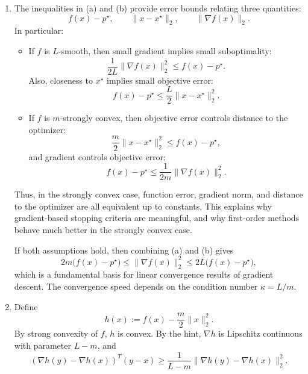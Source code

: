 \documentclass[11pt,letter,notitlepage]{article}
\theoremstyle{definition}
\begin{document}
\begin{solution}
\begin{enumerate}[label=(\alph*)]
    \item The inequalities in (a) and (b) provide error bounds relating three quantities:
    \[
    f(x)-p^\star,\qquad \|x-x^\star\|_2,\qquad \|\nabla f(x)\|_2.
    \]
    In particular:
    \begin{itemize}
        \item If $f$ is $L$-smooth, then small gradient implies small suboptimality:
        \[
        \frac1{2L}\|\nabla f(x)\|_2^2\le f(x)-p^\star.
        \]
        Also, closeness to $x^\star$ implies small objective error:
        \[
        f(x)-p^\star\le \frac{L}{2}\|x-x^\star\|_2^2.
        \]
        \item If $f$ is $m$-strongly convex, then objective error controls distance to the optimizer:
        \[
        \frac{m}{2}\|x-x^\star\|_2^2\le f(x)-p^\star,
        \]
        and gradient controls objective error:
        \[
        f(x)-p^\star\le \frac1{2m}\|\nabla f(x)\|_2^2.
        \]
    \end{itemize}
    Thus, in the strongly convex case, function error, gradient norm, and distance to the optimizer are all equivalent up to constants. This explains why gradient-based stopping criteria are meaningful, and why first-order methods behave much better in the strongly convex case.

    If both assumptions hold, then combining (a) and (b) gives
    \[
    2m\bigl(f(x)-p^\star\bigr)\le \|\nabla f(x)\|_2^2\le 2L\bigl(f(x)-p^\star\bigr),
    \]
    which is a fundamental basis for linear convergence results of gradient descent. The convergence speed depends on the condition number $\kappa=L/m$.

    \item Define
    \[
    h(x):=f(x)-\frac{m}{2}\|x\|_2^2.
    \]
    By strong convexity of $f$, $h$ is convex. By the hint, $\nabla h$ is Lipschitz continuous with parameter $L-m$, and
    \[
    (\nabla h(y)-\nabla h(x))^T(y-x)
    \ge
    \frac{1}{L-m}\|\nabla h(y)-\nabla h(x)\|_2^2.
    \]


\end{enumerate}
\end{solution}
\end{document}
